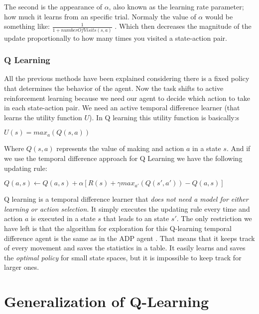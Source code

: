 The second is the appearance of $\alpha$, also known as the learning rate parameter; how much it learns from an specific trial. Normaly the value of  $\alpha$ would be something like: $\frac{1}{1+numberOfVisits(s,a)}$ \cite[p382]{ml_tom_mitchel}. Which then decreases the magnitude of the update proportionally to how many times you visited a state-action pair. 

\subsubsection{Q Learning}

All the previous methods have been explained considering there is a fixed policy that determines the behavior of the agent. Now the task shifts to active reinforcement learning because we need our agent to decide which action to take in each state-action pair. We need an active temporal difference learner (that learns the utility function $U$). In Q learning this utility function is basically:s\cite{rl}

\begin{center}
$U(s) = max_a(Q(s,a))$
\end{center}

Where $Q(s,a)$ represents the value of making and action $a$ in a state $s$. And if we use the temporal difference approach for Q Learning we have the following updating rule:\cite{rl} 

\begin{center}
$Q(a,s) \leftarrow  Q(a,s)  + \alpha [R(s) + \gamma max_{a'}(Q(s',a')) - Q(a,s)]$
\end{center}

Q learning is a temporal difference learner that \textit{does not need a model for either learning or action selection}\cite[p775]{rl}. It simply executes the updating rule every time and action $a$ is executed in a state $s$ that leads to an state $s'$. The only restriction we have left is that the algorithm for exploration for this Q-learning temporal difference agent is the same as in the ADP agent \cite[p776]{rl} . That means that it keeps track of every movement and saves the statistics in a table. It easily learns and saves the \emph{optimal policy} for small state spaces, but it is impossible to keep track for larger ones. 

\section{Generalization of Q-Learning}	\label{qlearning}

